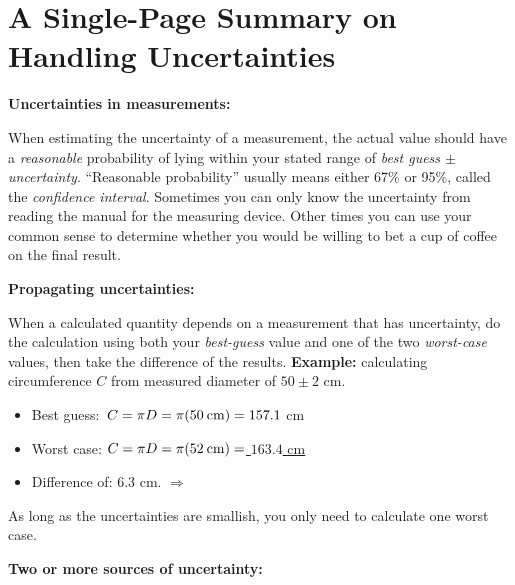 \section{A Single-Page Summary on Handling Uncertainties}

\textbf{Uncertainties in measurements:}
\vspace{-0.15cm}

When estimating the uncertainty of a measurement, the actual value should have a \textit{reasonable} probability of lying within your stated range of \textit{best guess $\pm$ uncertainty}.  ``Reasonable probability'' usually means either 67\% or 95\%, called the \textit{confidence interval}.  Sometimes you can only know the uncertainty from reading the manual for the measuring device.  Other times you can use your common sense to determine whether you would be willing to bet a cup of coffee on the final result.
\vspace{+0.15cm}

\textbf{Propagating uncertainties:}
\vspace{-0.15cm}

When a calculated quantity depends on a measurement that has uncertainty, do the calculation using both your \textit{best-guess} value and one of the two \textit{worst-case} values, then take the difference of the results.  \textbf{Example:} calculating circumference $C$ from measured diameter of $50\pm2$ cm.
\begin{itemize} \itemsep1pt
\vspace{-0.35cm}
	\item Best guess: $\,C=\pi D =\pi(50 \:\rm{cm}) = 157.1$ cm
	\item Worst case: $C=\pi D =\pi(52 \:\rm{cm}) =$\underline{ $163.4$  cm}
\vspace{-0.10cm}
	\item Difference of:        \hspace{100pt}                   6.3 cm. $\Longrightarrow$ 
\end{itemize}
\vspace{-0.35cm}
As long as the uncertainties are smallish, you only need to calculate one worst case.
\vspace{+0.15cm}

\textbf{Two or more sources of uncertainty:}
\vspace{-0.15cm}

